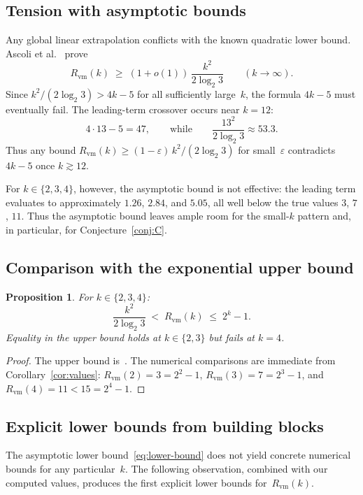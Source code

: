 \documentclass[11pt]{amsart}
\newtheorem{proposition}[theorem]{Proposition}
\theoremstyle{definition}
\theoremstyle{remark}
\newcommand{\Rvm}{R_{\mathrm{vm}}}
\begin{document}
\subsection{Tension with asymptotic bounds}

Any global linear extrapolation conflicts with the known quadratic lower
bound.
Ascoli et al.~\cite{AFFMP2026} prove
\begin{equation}\label{eq:lower-bound}
  \Rvm(k)
  \;\geq\;
  (1+o(1))\,\frac{k^2}{2\log_2 3}
  \qquad(k\to\infty).
\end{equation}
Since $k^2/(2\log_2 3)>4k-5$ for all sufficiently large~$k$, the
formula $4k-5$ must eventually fail.  The leading-term crossover occurs
near $k=12$:
\[
  4\cdot 13 - 5 = 47,
  \qquad\text{while}\qquad
  \frac{13^2}{2\log_2 3} \approx 53.3.
\]
Thus any bound $\Rvm(k)\geq(1-\varepsilon)\,k^2/(2\log_2 3)$ for
small~$\varepsilon$ contradicts $4k-5$ once $k\gtrsim 12$.

For $k\in\{2,3,4\}$, however, the asymptotic bound is not effective:
the leading term evaluates to approximately $1.26$, $2.84$, and $5.05$,
all well below the true values $3$, $7$, $11$.  Thus the asymptotic
bound leaves ample room for the small-$k$ pattern and, in particular,
for Conjecture~\ref{conj:C}.


\subsection{Comparison with the exponential upper bound}

\begin{proposition}\label{prop:bounds}
  For $k\in\{2,3,4\}$:
  \[
    \frac{k^2}{2\log_2 3}
    \;<\;
    \Rvm(k)
    \;\leq\;
    2^k - 1.
  \]
  Equality in the upper bound holds at $k\in\{2,3\}$ but fails at
  $k=4$.
\end{proposition}

\begin{proof}
  The upper bound is~\cite[Theorem~1.4]{AFFMP2026}.  The numerical
  comparisons are immediate from Corollary~\ref{cor:values}:
  $\Rvm(2)=3=2^2-1$, $\Rvm(3)=7=2^3-1$, and
  $\Rvm(4)=11<15=2^4-1$.
\end{proof}


\subsection{Explicit lower bounds from building blocks}\label{subsec:explicit-lower}

The asymptotic lower bound~\eqref{eq:lower-bound} does not yield
concrete numerical bounds for any particular~$k$.  The following
observation, combined with our computed values, produces the first
explicit lower bounds for~$\Rvm(k)$.
\end{document}
